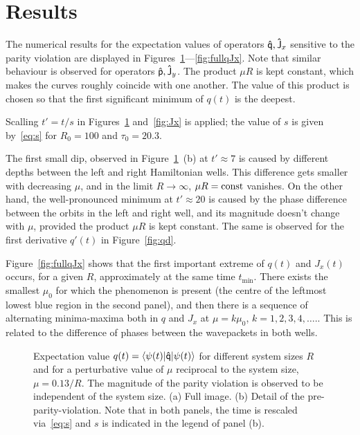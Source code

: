 \documentclass[a4paper,11pt,twoside]{article}
\begin{document}
\section{Results}
The numerical results for the expectation values of operators $\mathsf{\hat{q}}, \mathsf{\hat{J}}_{x}$ sensitive to the parity violation are displayed in Figures~\ref{fig:q}---\ref{fig:fullqJx}.
Note that similar behaviour is observed for operators $\mathsf{\hat{p}}, \mathsf{\hat{J}}_{y}$.
The product $\mu R$ is kept constant, which makes the curves roughly coincide with one another.
The value of this product is chosen so that the first significant minimum of $q(t)$ is the deepest.

Scalling $t'=t/s$ in Figures~\ref{fig:q} and~\ref{fig:Jx} is applied; the value of $s$ is given by~\eqref{eq:s} for $R_{0}=100$ and $\tau_{0}=20.3$.

The first small dip, observed in Figure~\ref{fig:q}~(b) at $t'\approx7$ is caused by different depths between the left and right Hamiltonian wells. 
This difference gets smaller with decreasing $\mu$, and in the limit $R\rightarrow\infty$, $\mu R=\mathrm{const}$ vanishes.
On the other hand, the well-pronounced minimum at $t'\approx20$ is caused by the phase difference between the orbits in the left and right well, and its magnitude doesn't change with $\mu$, provided the product $\mu R$ is kept constant.
The same is observed for the first derivative $q'(t)$ in Figure~\ref{fig:qd}.

Figure~\ref{fig:fullqJx} shows that the first important extreme of $q(t)$ and $J_{x}(t)$ occurs, for a given $R$, approximately at the same time $t_{\mathrm{min}}$.
There exists the smallest $\mu_0$ for which the phenomenon is present (the centre of the leftmost lowest blue region in the second panel), and then there is a sequence of alternating minima-maxima both in $q$ and $J_{x}$ at $\mu=k\mu_{0}$, $k=1,2,3,4,\dotsc.$.
This is related to the difference of phases between the wavepackets in both wells.

\begin{figure}[!h]
        \begin{subfigure}{0.49\linewidth}
            \centering{}
        \end{subfigure}
        \hfill
        \begin{subfigure}{0.49\linewidth}
            \centering{}
        \end{subfigure}
		\caption{Expectation value $q(t)=\left\langle{\psi(t)}\middle|{\mathsf{\hat{q}}}\middle|{\psi(t)}\right\rangle$ for different system sizes $R$ and for a perturbative value of $\mu$ reciprocal to the system size, $\mu=0.13/R$.
		The magnitude of the parity violation is observed to be independent of the system size. (a) Full image. (b) Detail of the pre-parity-violation. 
		Note that in both panels, the time is rescaled via~\eqref{eq:s} and $s$ is indicated in the legend of panel (b).}
		\label{fig:q}
	\end{figure}   	
\end{document}
